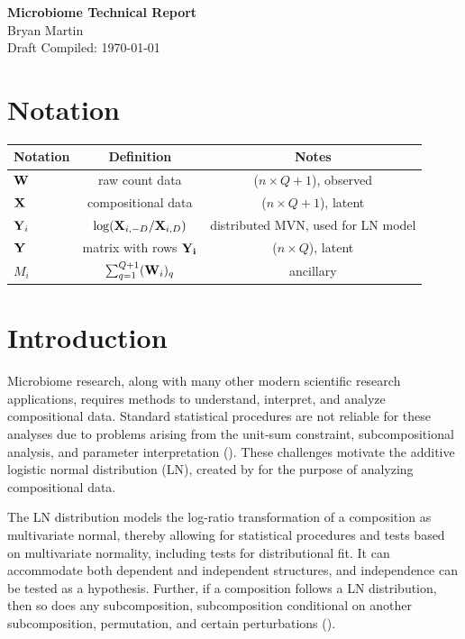 \documentclass{template}
\begin{document}
\begin{center}
  {\Large \textbf{Microbiome Technical Report}}\\
  {\large Bryan Martin} \\ 
  {Draft Compiled: \today} 
\end{center}

\setcounter{section}{-1}

\section{Notation}
 \begin{table}[ht]
\centering
\begin{tabular}{l|c|c}
\textbf{Notation} & \textbf{Definition} & \textbf{Notes} \\
  \hline \hline
$\mathbf{W}$ & raw count data & ($n\times Q+1$), observed\\
$\mathbf{X}$ & compositional data & ($n\times Q+1$), latent\\
$\mathbf{Y}_i$ & $\log(\mathbf{X}_{i,-D}/\mathbf{X}_{i,D})$ & distributed MVN, used for LN model\\
$\mathbf{Y}$ & matrix with rows $\mathbf{Y_i}$ & ($n \times Q$), latent \\
$M_i$ & $\sum_{q=1}^{Q+1} (\mathbf{W}_i)_q$ & ancillary
\end{tabular}
\end{table}

\section{Introduction}

Microbiome research, along with many other modern scientific research applications, requires methods to understand, interpret, and analyze compositional data. Standard statistical procedures are not reliable for these analyses due to problems arising from the unit-sum constraint, subcompositional analysis, and parameter interpretation (\cite{aitchison1986statistical}). These challenges motivate the additive logistic normal distribution (LN), created by \cite{aitchison1986statistical} for the purpose of analyzing compositional data.

The LN distribution models the log-ratio transformation of a composition as multivariate normal, thereby allowing for statistical procedures and tests based on multivariate normality, including tests for distributional fit. It can accommodate both dependent and independent structures, and independence can be tested as a hypothesis. Further, if a composition follows a LN distribution, then so does any subcomposition, subcomposition conditional on another subcomposition, permutation, and certain perturbations (\cite{aitchison1986statistical}). 
\end{document}
